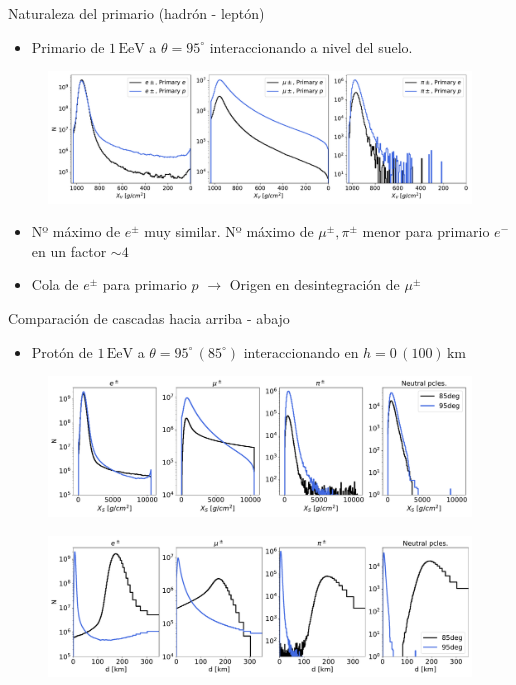 \documentclass{beamer}
\begin{document}
\begin{frame}{Naturaleza del primario (hadrón - leptón)}
	\begin{itemize}
		\item Primario de $1\,\mathrm{EeV}$ a $\theta = 95^\circ$ interaccionando a nivel del suelo.
		\end{itemize}
			\begin{figure}[H]
			\centering
			\includegraphics[width=1.\linewidth]{figures/cascadas/upgoing_pe_1EeV_95deg_0km_v2}
		\end{figure}
	\begin{itemize}
		\item Nº máximo de $e^\pm$ muy similar. Nº máximo de $\mu^\pm,\pi^\pm$ menor para primario $e^-$ en un factor $\sim 4$
		\item Cola de $e^\pm$ para primario $p$ $\rightarrow$ Origen en desintegración de $\mu^\pm$
	\end{itemize}
\end{frame}
\begin{frame}{Comparación de cascadas hacia arriba - abajo}
	\begin{itemize}
		\item Protón de $1\,\mathrm{EeV}$ a $\theta=95^\circ \,(85^\circ)$ interaccionando en $h=0\,(100)\,\mathrm{km}$ 
	\end{itemize}
		\begin{figure}[H]
	\centering
	\includegraphics[width=.9\linewidth]{figures/cascadas/comp_ugdg_number}
\end{figure}
\begin{figure}[H]
	\centering
	\includegraphics[width=.9\linewidth]{figures/cascadas/comp_ugdg_number_vsd}
\end{figure}
\end{frame}
\end{document}
